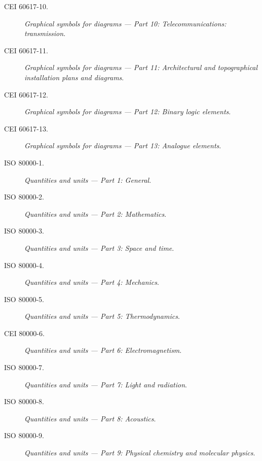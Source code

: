 \begin{description}
	\item [\hspace{5mm}CEI 60617-10.] \textit{Graphical symbols for diagrams --- Part 10: Telecommunications: transmission}.
	\item [\hspace{5mm}CEI 60617-11.] \textit{Graphical symbols for diagrams --- Part 11: Architectural and topographical installation plans and diagrams}.
	\item [\hspace{5mm}CEI 60617-12.] \textit{Graphical symbols for diagrams --- Part 12: Binary logic elements}.
	\item [\hspace{5mm}CEI 60617-13.] \textit{Graphical symbols for diagrams --- Part 13: Analogue elements}.
	\item [\hspace{5mm}ISO 80000-1.] \textit{Quantities and units --- Part 1: General}.
	\item [\hspace{5mm}ISO 80000-2.] \textit{Quantities and units --- Part 2: Mathematics}.
	\item [\hspace{5mm}ISO 80000-3.] \textit{Quantities and units --- Part 3: Space and time}. 
	\item [\hspace{5mm}ISO 80000-4.] \textit{Quantities and units --- Part 4: Mechanics}.
	\item [\hspace{5mm}ISO 80000-5.] \textit{Quantities and units --- Part 5: Thermodynamics}.
	\item [\hspace{5mm}CEI 80000-6.] \textit{Quantities and units --- Part 6: Electromagnetism}.
	\item [\hspace{5mm}ISO 80000-7.] \textit{Quantities and units --- Part 7: Light and radiation}.
	\item [\hspace{5mm}ISO 80000-8.] \textit{Quantities and units --- Part 8: Acoustics}.
	\item [\hspace{5mm}ISO 80000-9.] \textit{Quantities and units --- Part 9: Physical chemistry and molecular physics}.

\end{description}
